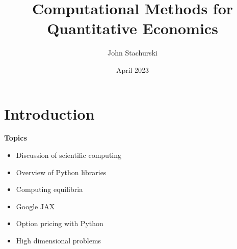 \documentclass[
    xcolor={svgnames,dvipsnames},
    hyperref={colorlinks, citecolor=DeepPink4, linkcolor=DarkRed, urlcolor=DarkBlue}
    ]{beamer}  %
\title{Computational Methods for Quantitative Economics}
\author{John Stachurski}
\date{April 2023}
\newcommand{\1}{\mathbbm 1}
\begin{document}
\begin{frame}
  \titlepage
\end{frame}





\section{Introduction}



\begin{frame}


    \textbf{Topics}

    \begin{itemize}
        \item Discussion of scientific computing
        \vspace{0.5em}
        \item Overview of Python libraries
        \vspace{0.5em}
        \item Computing equilibria
        \vspace{0.5em}
        \item Google JAX
        \vspace{0.5em}
        \item Option pricing with Python
        \vspace{0.5em}
        \item High dimensional problems
    \end{itemize}

\end{frame}
\end{document}
